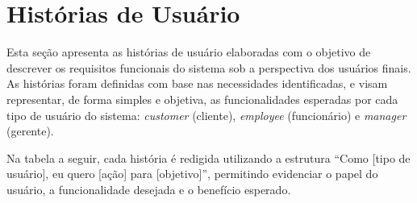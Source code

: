 \section{Histórias de Usuário}

Esta seção apresenta as histórias de usuário elaboradas com o objetivo de descrever os requisitos funcionais do sistema sob a perspectiva dos usuários finais. As histórias foram definidas com base nas necessidades identificadas, e visam representar, de forma simples e objetiva, as funcionalidades esperadas por cada tipo de usuário do sistema: \textit{customer} (cliente), \textit{employee} (funcionário) e \textit{manager} (gerente). 

Na tabela a seguir, cada história é redigida utilizando a estrutura “Como [tipo de usuário], eu quero [ação] para [objetivo]”, permitindo evidenciar o papel do usuário, a funcionalidade desejada e o benefício esperado.


